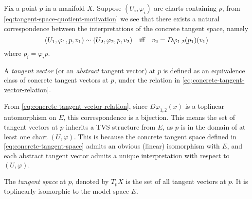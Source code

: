 \documentclass[../main-manifolds.tex]{subfiles}
\begin{document}
Fix a point $p$ in a manifold $X$. Suppose $(U_i,\varphi_i)$ are charts containing $p$, from \cref{eq:tangent-space-quotient-motivation} we see that there exists a natural correspondence between the interpretations of the concrete tangent space, namely 
\begin{equation}\label{eq:concrete-tangent-vector-relation}
    (U_1,\varphi_1,p,v_1)\sim (U_2,\varphi_2,p,v_2)\qqtext{iff} v_2 = D\varphi_{1,2}(p_1)(v_1)
\end{equation}
where $p_i = \varphi_i p$. 
\begin{definition}
    A \emph{tangent vector} (or an \emph{abstract} tangent vector) at $p$ is defined as an equivalence class of concrete tangent vectors at $p$, under the relation in \cref{eq:concrete-tangent-vector-relation}.
\end{definition}

From \cref{eq:concrete-tangent-vector-relation}, since $D\varphi_{1,2}(x)$ is a toplinear automorphism on $E$, this correspondence is a bijection. This means the set of tangent vectors at $p$ inherits a TVS structure from $E$, as $p$ is in the domain of at least one chart $(U,\varphi)$. This is because the concrete tangent space defined in \cref{eq:concrete-tangent-space} admits an obvious (linear) isomorphism with $E$, and each abstract tangent vector admits a unique interpretation with respect to $(U,\varphi)$.

\begin{definition}
    The \emph{tangent space} at $p$, denoted by $T_p X$ is the set of all tangent vectors at $p$. It is toplinearly isomorphic to the model space $E$.
\end{definition}
\end{document}
